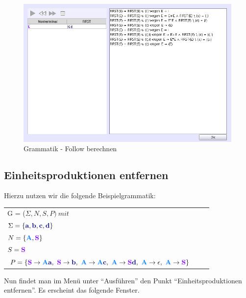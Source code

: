 \begin{figure}[h]
\begin{center}
\includegraphics[width=12cm]{../images/follow.png}
\caption{Grammatik - Follow berechnen}
\end{center}
\end{figure}

\subsection{Einheitsproduktionen entfernen}

Hierzu nutzen wir die folgende Beispielgrammatik:

\begin{tabular}{lcr}
G = ($\Sigma, N, S, P )\ mit $\\
$\Sigma = \{\TerminalSymbol{a}, \TerminalSymbol{b}, \TerminalSymbol{c},
\TerminalSymbol{d}\}$\\ $N =
\{\NonterminalSymbol{A}, \StartSymbol{S}\}$\\ $S=\StartSymbol{S}$\\
$P = \{\StartSymbol{S} \to \NonterminalSymbol{A}\TerminalSymbol{a},\ \StartSymbol{S} \to \TerminalSymbol{b},\
\NonterminalSymbol{A}	\to \NonterminalSymbol{A}\TerminalSymbol{c},\ \NonterminalSymbol{A} \to \StartSymbol{S}\TerminalSymbol{d},\
\NonterminalSymbol{A} \to \epsilon, \
\NonterminalSymbol{A} \to \StartSymbol{S}\}$\\
\end{tabular}

Nun findet man im Menü unter "`Ausführen"' den Punkt "`Einheitsproduktionen entfernen"'. Es erscheint das folgende Fenster.

